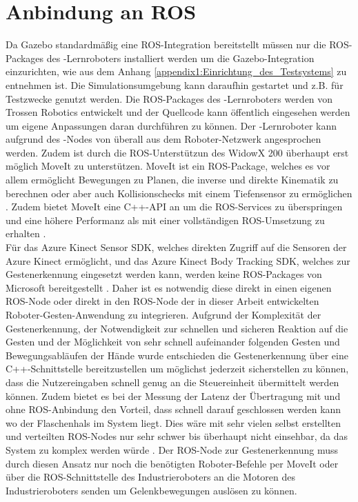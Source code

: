 
\section{Anbindung an ROS}
Da Gazebo standardmäßig eine ROS-Integration bereitstellt müssen nur die ROS-Packages des -Lernroboters installiert werden um die Gazebo-Integration einzurichten, wie aus dem Anhang \ref{appendix1:Einrichtung_des_Testsystems} zu entnehmen ist. Die Simulationsumgebung kann daraufhin gestartet und z.B. für Testzwecke genutzt werden. Die ROS-Packages des -Lernroboters werden von Trossen Robotics entwickelt und der Quellcode kann öffentlich eingesehen werden um eigene Anpassungen daran durchführen zu können. Der -Lernroboter kann aufgrund des -Nodes von überall aus dem Roboter-Netzwerk angesprochen werden. Zudem ist durch die ROS-Unterstützun des WidowX 200 überhaupt erst möglich MoveIt zu unterstützen. MoveIt ist ein ROS-Package, welches es vor allem ermöglicht Bewegungen zu Planen, die inverse und direkte Kinematik zu berechnen oder aber auch Kollisionschecks mit einem Tiefensensor zu ermöglichen \cite{moveit_nodate}. Zudem bietet MoveIt eine C++-API an um die ROS-Services zu überspringen und eine höhere Performanz als mit einer vollständigen ROS-Umsetzung zu erhalten \cite{moveit_tutorial_nodate}.\\

Für das Azure Kinect Sensor SDK, welches direkten Zugriff auf die Sensoren der Azure Kinect ermöglicht, und das Azure Kinect Body Tracking SDK, welches zur Gestenerkennung eingesetzt werden kann, werden keine ROS-Packages von Microsoft bereitgestellt \cite{tesych_about_azure_kinect_sdks_nodate}. Daher ist es notwendig diese direkt in einen eigenen ROS-Node oder direkt in den ROS-Node der in dieser Arbeit entwickelten Roboter-Gesten-Anwendung zu integrieren. Aufgrund der Komplexität der Gestenerkennung, der Notwendigkeit zur schnellen und sicheren Reaktion auf die Gesten und der Möglichkeit von sehr schnell aufeinander folgenden Gesten und Bewegungsabläufen der Hände wurde entschieden die Gestenerkennung über eine C++-Schnittstelle bereitzustellen um möglichst jederzeit sicherstellen zu können, dass die Nutzereingaben schnell genug an die Steuereinheit übermittelt werden können. Zudem bietet es bei der Messung der Latenz der Übertragung mit und ohne ROS-Anbindung den Vorteil, dass schnell darauf geschlossen werden kann wo der Flaschenhals im System liegt. Dies wäre mit sehr vielen selbst erstellten und verteilten ROS-Nodes nur sehr schwer bis überhaupt nicht einsehbar, da das System zu komplex werden würde \cite{why_dont_we_use_ros_nodate}. Der ROS-Node zur Gestenerkennung muss durch diesen Ansatz nur noch die benötigten Roboter-Befehle per MoveIt oder über die ROS-Schnittstelle des Industrieroboters an die Motoren des Industrieroboters senden um Gelenkbewegungen auslösen zu können.

